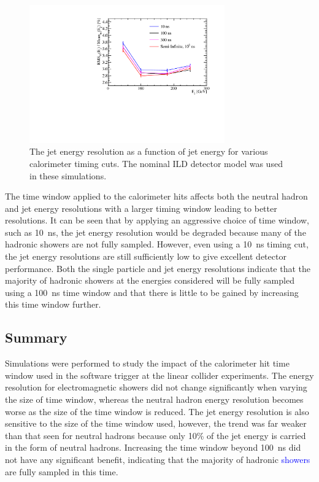 \begin{figure}[h!]
\includegraphics[width=0.75\textwidth]{EnergyEstimators/Plots/TimingCuts/JER_vs_JetEnergy_TimingCutStudies.pdf}
\caption[The jet energy resolution as a function of jet energy for various calorimeter timing cuts.  The nominal ILD detector model was used in these simulations.]{The jet energy resolution as a function of jet energy for various calorimeter timing cuts.  The nominal ILD detector model was used in these simulations.}
\label{fig:jertimingcuts}
\end{figure}

The time window applied to the calorimeter hits affects both the neutral hadron and jet energy resolutions with a larger timing window leading to better resolutions.  It can be seen that by applying an aggressive choice of time window, such as 10~ns, the jet energy resolution would be degraded because many of the hadronic showers are not fully sampled.  However, even using a 10~ns timing cut, the jet energy resolutions are still sufficiently low to give excellent detector performance.  Both the single particle and jet energy resolutions indicate that the majority of hadronic showers at the energies considered will be fully sampled using a 100~ns time window and that there is little to be gained by increasing this time window further.


\subsection{Summary}
Simulations were performed to study the impact of the calorimeter hit time window used in the software trigger at the linear collider experiments.  The energy resolution for electromagnetic showers did not change significantly when varying the size of time window, whereas the neutral hadron energy resolution becomes worse as the size of the time window is reduced.  The jet energy resolution is also sensitive to the size of the time window used, however, the trend was far weaker than that seen for neutral hadrons because only 10\% of the jet energy is carried in the form of neutral hadrons.  Increasing the time window beyond 100~ns did not have any significant benefit, indicating that the majority of hadronic \textcolor{blue}{showers} are fully sampled in this time.   

